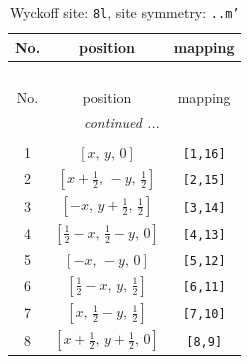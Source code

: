 \documentclass[fleqn,8pt]{jsarticle}
\begin{document}
\begin{longtable}{ccc}
\caption{Wyckoff site: {\tt 8l}, site symmetry: {\tt ..m'}}
 \\
 \hline \hline
No. & position & mapping \\ \hline \endfirsthead

\multicolumn{2}{l}{\tablename\ \thetable{}} \\
 \hline \hline
No. & position & mapping \\ \hline \endhead

 \hline \hline
\multicolumn{2}{r}{\footnotesize\it continued ...} \\ \endfoot

 \hline \hline
\multicolumn{2}{r}{} \\ \endlastfoot

1 & $\left[ x,\, y,\, 0 \right]$ & {\tt [1,16]} \\ \hline
2 & $\left[ x + \frac{1}{2},\, - y,\, \frac{1}{2} \right]$ & {\tt [2,15]} \\ \hline
3 & $\left[ - x,\, y + \frac{1}{2},\, \frac{1}{2} \right]$ & {\tt [3,14]} \\ \hline
4 & $\left[ \frac{1}{2} - x,\, \frac{1}{2} - y,\, 0 \right]$ & {\tt [4,13]} \\ \hline
5 & $\left[ - x,\, - y,\, 0 \right]$ & {\tt [5,12]} \\ \hline
6 & $\left[ \frac{1}{2} - x,\, y,\, \frac{1}{2} \right]$ & {\tt [6,11]} \\ \hline
7 & $\left[ x,\, \frac{1}{2} - y,\, \frac{1}{2} \right]$ & {\tt [7,10]} \\ \hline
8 & $\left[ x + \frac{1}{2},\, y + \frac{1}{2},\, 0 \right]$ & {\tt [8,9]} \\
\end{longtable}
\renewcommand{\arraystretch}{1.2}
\end{document}
